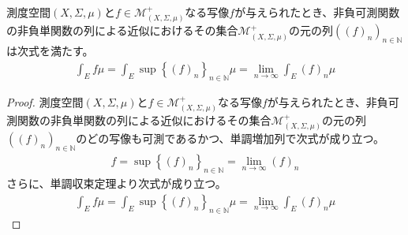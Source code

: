 \documentclass[dvipdfmx]{jsarticle}
\begin{document}
\begin{thm}\label{4.6.1.28}
測度空間$(X,\varSigma,\mu)$と$f \in \mathcal{M}_{(X,\varSigma,\mu)}^{+}$なる写像$f$が与えられたとき、非負可測関数の非負単関数の列による近似におけるその集合$\mathcal{M}_{(X,\varSigma,\mu)}^{+}$の元の列$\left( (f)_{n} \right)_{n \in \mathbb{N}}$は次式を満たす。
\begin{align*}
\int_{E} {f\mu} = \int_{E} {\sup\left\{ (f)_{n} \right\}_{n \in \mathbb{N}}\mu} = \lim_{n \rightarrow \infty}{\int_{E} {(f)_{n}\mu}}
\end{align*}
\end{thm}
\begin{proof}
測度空間$(X,\varSigma,\mu)$と$f \in \mathcal{M}_{(X,\varSigma,\mu)}^{+}$なる写像$f$が与えられたとき、非負可測関数の非負単関数の列による近似におけるその集合$\mathcal{M}_{(X,\varSigma,\mu)}^{+}$の元の列$\left( (f)_{n} \right)_{n \in \mathbb{N}}$のどの写像も可測であるかつ、単調増加列で次式が成り立つ。
\begin{align*}
f = \sup\left\{ (f)_{n} \right\}_{n \in \mathbb{N}} = \lim_{n \rightarrow \infty}(f)_{n}
\end{align*}
さらに、単調収束定理より次式が成り立つ。
\begin{align*}
\int_{E} {f\mu} = \int_{E} {\sup\left\{ (f)_{n} \right\}_{n \in \mathbb{N}}\mu} = \lim_{n \rightarrow \infty}{\int_{E} {(f)_{n}\mu}}
\end{align*}
\end{proof}
\end{document}
